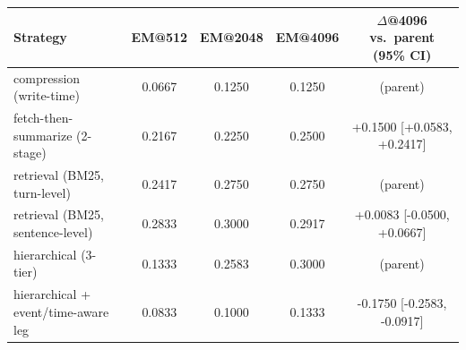 \begin{tabular}{lcccc}
\toprule
Strategy & EM@512 & EM@2048 & EM@4096 & $\Delta$@4096 vs.\ parent (95\% CI) \\
\midrule
compression (write-time) & 0.0667 & 0.1250 & 0.1250 & (parent) \\
fetch-then-summarize (2-stage) & 0.2167 & 0.2250 & 0.2500 & +0.1500 [+0.0583, +0.2417] \\
retrieval (BM25, turn-level) & 0.2417 & 0.2750 & 0.2750 & (parent) \\
retrieval (BM25, sentence-level) & 0.2833 & 0.3000 & 0.2917 & +0.0083 [-0.0500, +0.0667] \\
hierarchical (3-tier) & 0.1333 & 0.2583 & 0.3000 & (parent) \\
hierarchical + event/time-aware leg & 0.0833 & 0.1000 & 0.1333 & -0.1750 [-0.2583, -0.0917] \\
\bottomrule
\end{tabular}
